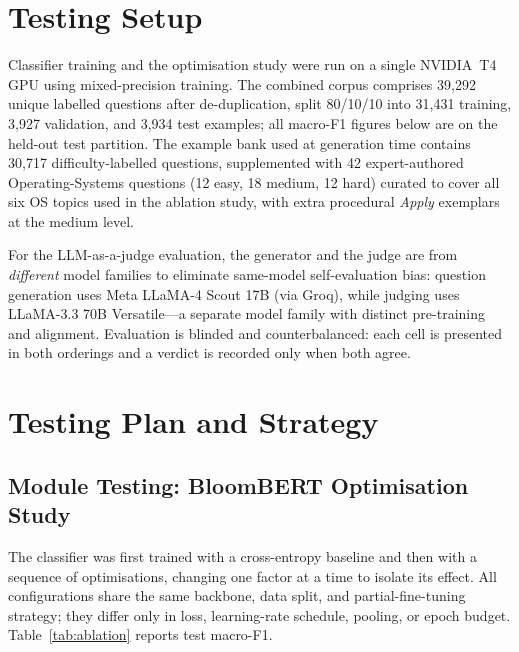 \documentclass[12pt,a4paper]{report}
\begin{document}
\section{Testing Setup}
Classifier training and the optimisation study were run on a single NVIDIA~T4
GPU using mixed-precision training. The combined corpus comprises 39{,}292 unique
labelled questions after de-duplication, split 80/10/10 into 31{,}431 training,
3{,}927 validation, and 3{,}934 test examples; all macro-F1 figures below are on
the held-out test partition. The example bank used at generation time contains
30{,}717 difficulty-labelled questions, supplemented with 42 expert-authored
Operating-Systems questions (12 easy, 18 medium, 12 hard) curated to cover all
six OS topics used in the ablation study, with extra procedural \emph{Apply}
exemplars at the medium level.

For the LLM-as-a-judge evaluation, the generator and the judge are from
\emph{different} model families to eliminate same-model self-evaluation bias:
question generation uses Meta LLaMA-4 Scout 17B (via Groq), while judging uses
LLaMA-3.3 70B Versatile---a separate model family with distinct pre-training and
alignment. Evaluation is blinded and counterbalanced: each cell is presented in
both orderings and a verdict is recorded only when both agree.

\section{Testing Plan and Strategy}

\subsection{Module Testing: BloomBERT Optimisation Study}
The classifier was first trained with a cross-entropy baseline and then with a
sequence of optimisations, changing one factor at a time to isolate its effect.
All configurations share the same backbone, data split, and partial-fine-tuning
strategy; they differ only in loss, learning-rate schedule, pooling, or epoch
budget. Table~\ref{tab:ablation} reports test macro-F1.
\end{document}
